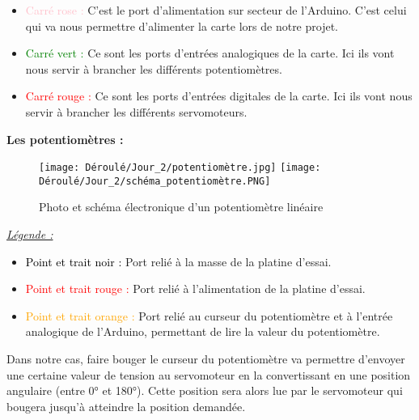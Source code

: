 \begin{flushleft}
\begin{itemize}
        \item \textcolor{pink}{Carré rose :} C'est le port d'alimentation sur secteur de l'Arduino. C'est celui qui va nous permettre d'alimenter la carte lors de notre projet.\\\vspace{0.2cm}
        
        \item \textcolor{green}{Carré vert :} Ce sont les ports d'entrées analogiques de la carte. Ici ils vont nous servir à brancher les différents potentiomètres.\\\vspace{0.2cm}
        
        \item \textcolor{red}{Carré rouge :} Ce sont les ports d'entrées digitales de la carte. Ici ils vont nous servir à brancher les différents servomoteurs.\vspace{0.2cm}
    \end{itemize}
    
    \newpage
    
    \textbf{Les potentiomètres :}\vspace{0.4cm}
    \begin{figure}[!h]
        \centering
        \texttt{[image: Déroulé/Jour\_2/potentiomètre.jpg]}
        \texttt{[image: Déroulé/Jour\_2/schéma\_potentiomètre.PNG]}
        \caption[Potentiomètre]{Photo et schéma électronique d'un potentiomètre linéaire}
        \label{2.4}
    \end{figure}
    \begin{flushleft}
    \underline{\textit{\large Légende :}}\vspace{0.4cm}
    
        \begin{itemize}
    \item \textcolor{black}{Point et trait noir :} Port relié à la masse de la platine d'essai.\vspace{0.2cm}
    \item \textcolor{red}{Point et trait rouge :} Port relié à l'alimentation de la platine d'essai.\vspace{0.2cm}
    \item \textcolor{orange}{Point et trait orange :} Port relié au curseur du potentiomètre et à l'entrée analogique de l'Arduino, permettant de lire la valeur du potentiomètre.
    \end{itemize}
    \end{flushleft}
    
    Dans notre cas, faire bouger le curseur du potentiomètre va permettre d'envoyer une certaine valeur de tension au servomoteur en la convertissant en une position angulaire (entre 0° et 180°). Cette position sera alors lue par le servomoteur qui bougera jusqu'à atteindre la position demandée.\\
    \end{flushleft}
    
